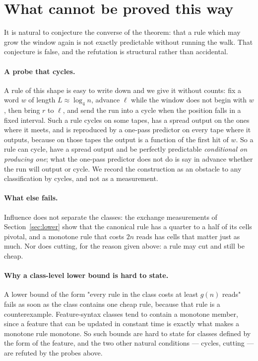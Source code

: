 \documentclass[11pt]{article}
\begin{document}
\section{What cannot be proved this way}\label{sec:barrier}

It is natural to conjecture the converse of the theorem: that a rule which may grow the window again
is not exactly predictable without running the walk. That conjecture is false, and the refutation is
structural rather than accidental.

\paragraph{A probe that cycles.} A rule of this shape is easy to write down and we give it without
counts: fix a word $w$ of length $L\approx\log_4 n$, advance $\ell$ while the window does not begin
with $w$, then bring $r$ to $\ell$, and send the run into a cycle when the position falls in a fixed
interval. Such a rule cycles on some tapes, has a spread output on the ones where it meets, and is
reproduced by a one-pass predictor on every tape where it outputs, because on those tapes the output
is a function of the first hit of $w$. So a rule can cycle, have a spread output and be perfectly
predictable \emph{conditional on producing one}; what the one-pass predictor does not do is say in
advance whether the run will output or cycle. We record the construction as an obstacle to any
classification by cycles, and not as a measurement.

\paragraph{What else fails.} Influence does not separate the classes: the exchange measurements of
Section~\ref{sec:lower} show that the canonical rule has a quarter to a half of its cells pivotal,
and a monotone rule that costs $2n$ reads has cells that matter just as much. Nor does cutting, for
the reason given above: a rule may cut and still be cheap.



\paragraph{Why a class-level lower bound is hard to state.} A lower bound of the form "every
rule in the class costs at least $g(n)$ reads" fails as soon as the class contains one cheap
rule, because that rule is a counterexample. Feature-syntax classes tend to contain a monotone
member, since a feature that can be updated in constant time is exactly what makes a monotone rule
monotone. So such bounds are hard to state for classes defined by the form of the feature, and the
two other natural conditions --- cycles, cutting --- are refuted by the probes above.
\end{document}
